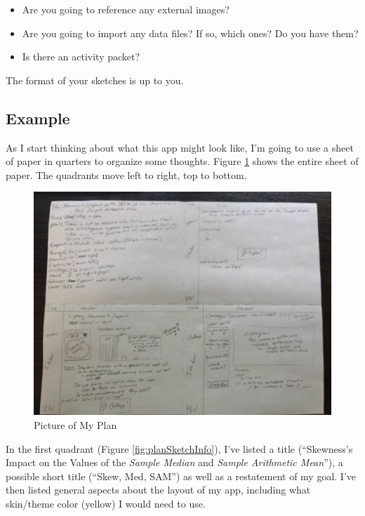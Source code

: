 \documentclass[
]{book}
\providecommand{\tightlist}{%
  \setlength{\itemsep}{0pt}\setlength{\parskip}{0pt}}
\begin{document}
\begin{itemize}
  \begin{itemize}
  \tightlist
  \item
    Are you going to reference any external images?
  \item
    Are you going to import any data files? If so, which ones? Do you have them?
  \item
    Is there an activity packet?
  \end{itemize}
\end{itemize}

The format of your sketches is up to you.

\hypertarget{example-1}{%
\subsection{Example}\label{example-1}}

As I start thinking about what this app might look like, I'm going to use a sheet of paper in quarters to organize some thoughts. Figure \ref{fig:planSketchFull} shows the entire sheet of paper. The quadrants move left to right, top to bottom.

\begin{figure}

{\centering \includegraphics[width=22.22in]{images/planSketch1} 

}

\caption{Picture of My Plan}\label{fig:planSketchFull}
\end{figure}

In the first quadrant (Figure \ref{fig:planSketchInfo}), I've listed a title (``Skewness's Impact on the Values of the \emph{Sample Median} and \emph{Sample Arithmetic Mean}''), a possible short title (``Skew, Med, SAM'') as well as a restatement of my goal. I've then listed general aspects about the layout of my app, including what skin/theme color (yellow) I would need to use.
\end{document}
